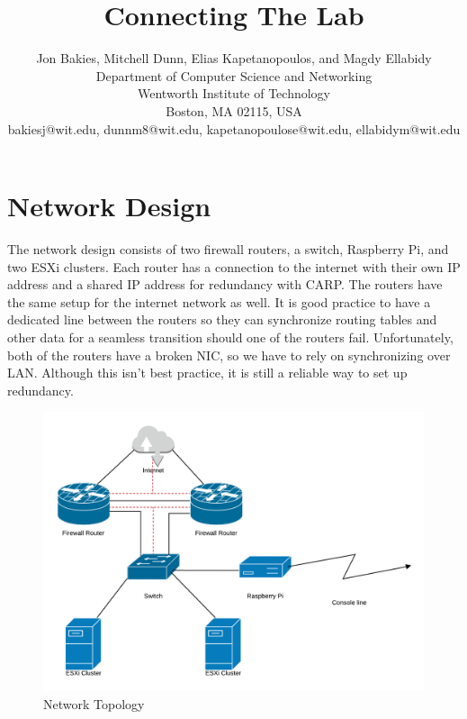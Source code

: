 \documentclass[12pt]{IEEEtran}
\begin{document}
\title{Connecting The Lab}
\author{
Jon Bakies, Mitchell Dunn, Elias Kapetanopoulos, and Magdy Ellabidy \\
Department of Computer Science and Networking \\
Wentworth Institute of Technology \\
Boston, MA 02115, USA \\
bakiesj@wit.edu, dunnm8@wit.edu, kapetanopoulose@wit.edu, ellabidym@wit.edu
} 

\maketitle
\clearpage


\section{Network Design}
The network design consists of two firewall routers, a switch, Raspberry Pi, and two ESXi clusters.
Each router has a connection to the internet with their own IP address and a shared IP address for redundancy with CARP.
The routers have the same setup for the internet network as well.
It is good practice to have a dedicated line between the routers so they can synchronize routing tables and other data for a seamless transition should one of the routers fail.
Unfortunately, both of the routers have a broken NIC, so we have to rely on synchronizing over LAN.
Although this isn't best practice, it is still a reliable way to set up redundancy.



\begin{figure}[t]
	\centering
	\includegraphics[width=\textwidth]{topology.png}
	\caption{Network Topology}
\end{figure}
\end{document}
